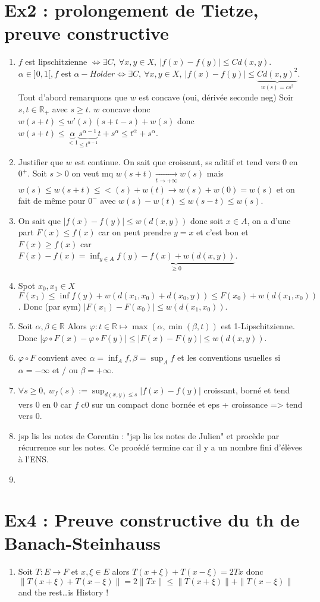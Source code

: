 \documentclass[a4paper]{article}
\begin{document}
\section*{Ex2 : prolongement de Tietze, preuve constructive}
\begin{enumerate}
    \item $f$ est lipschitzienne $\Leftrightarrow \exists C,\ \forall x,y\in X,\ |f(x)-f(y)|\le Cd(x,y) $. \\
        $\alpha \in ]0,1[, f$ est $\alpha -Holder\Leftrightarrow \exists C,\ \forall x,y\in X,\ |f(x)-f(y)|\le \underbrace{Cd(x,y)^2}_{w(s)=cs^2} $.\\
        Tout d'abord remarquons que $w$ est concave (oui, dérivée seconde neg) Soir $s,t\in \mathbb{R} _+$ avec $s\ge t$. $w$ concave donc $w(s+t)\le w'(s)(s+t-s)+w(s)$ donc $w(s+t)\le \underbrace{\alpha}_{<1}\underbrace{s^{\alpha -1}}_{\le t^{\alpha -1}}t+s^{\alpha }\le t^\alpha +s^\alpha  $.

        \item Justifier que $w$ est continue. On sait que croissant, ss aditif et tend vers 0 en $0^+$. Soit $s>0$ on veut mq $w(s+t)\xrightarrow[t\to +\infty]{} w(s)$ mais $w(s)\le w(s+t)\le <(s)+w(t)\to w(s)+w(0)=w(s)$ et on fait de même pour $0^-$ avec $w(s)-w(t)\le w(s-t)\le w(s)$.

        \item On sait que $|f(x)-f(y)|\le w(d(x,y))$ donc soit $x\in A$, on a d'une part $F(x)\le f(x)$ car on peut prendre $y=x$ et c'est bon et $F(x)\ge f(x)$ car $F(x)-f(x)=\inf_{y\in A}\underbrace{f(y)-f(x)+w(d(x,y))}_{\ge 0}$.

    \item Spot $x_0,x_1\in X $ $F(x_1)\le \inf f(y)+w(d(x_1,x_0)+d(x_0,y))\le F(x_0)+w(d(x_1,x_0))$. Donc (par sym) $|F(x_1)-F(x_0)|\le w(d(x_1,x_0))$.

    \item Soit $\alpha , \beta\in \mathbb{R} $ Alors $\varphi :t\in \mathbb{R} \mapsto \max(\alpha , \min (\beta,t))$ est 1-Lipschitzienne. Donc $|\varphi \circ F(x)-\varphi \circ F(y)|\le |F(x)-F(y)|\le w(d(x,y))$.
    \item 
        $\varphi\circ F$  convient avec $\alpha =\inf_Af, \beta=\sup_Af$ et les conventions usuelles si $\alpha =-\infty $ et / ou $\beta=+\infty $.

    \item $\forall s\ge 0,\ w_f(s):=\sup_{d(x,y)\le s}|f(x)-f(y)| $ croissant, borné et tend vers 0 en 0 car $f$ c0 sur un compact donc bornée et eps + croissance => tend vers 0.

    \item jsp lis les notes de Corentin : "jsp lis les notes de Julien" et procède par récurrence sur les notes. Ce procédé termine car il y a un nombre fini d'élèves à l'ENS.

    \item 

\end{enumerate}


\section*{Ex4 : Preuve constructive du th de Banach-Steinhauss}
    \begin{enumerate}
        \item Soit $T:E\to F$ et $x, \xi\in E$ alors $T(x+\xi)+T(x-\xi)=2Tx$ donc $\|T(x+\xi)+T(x-\xi)\|=2\|Tx\|\le \|T(x+\xi)\|+\|T(x-\xi)\|$ and the rest\ldots is History !
    \end{enumerate}
\end{document}
